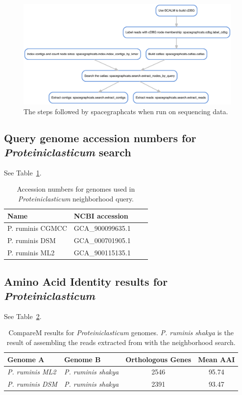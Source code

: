 \begin{figure}
 \centering
 \includegraphics[width=\linewidth]{figures/sgc_dag}
	\caption{The steps followed by \textsf{spacegraphcats} when run
on sequencing data.
}
 \label{fig:sgc_dag}
\end{figure}

\subsection{Query genome accession numbers for {\em Proteiniclasticum} search}
\label{subsec:query_accessions}

See Table~\ref{tab:query_accessions}.

\begin{table}[b]
  \begin{tabular}{l l c c }
    \toprule
    Name & NCBI accession \\
    \midrule
    \hline
    P. ruminis CGMCC & GCA\_900099635.1 \\
    P. ruminis DSM & GCA\_000701905.1 \\
    P. ruminis ML2 & GCA\_900115135.1 \\
    \hline
    \bottomrule
  \end{tabular}
  \caption{Accession numbers for genomes used in {\em Proteiniclasticum} neighborhood query.}
  \label{tab:query_accessions}
\end{table}

\subsection{Amino Acid Identity results for {\em Proteiniclasticum}}
\label{subsec:aai}

See Table~\ref{tab:aai}.

\begin{table}
  \begin{tabular}{l l c c }
    \toprule
    Genome A & Genome B & Orthologous Genes & Mean AAI \\
    \midrule
    {\em P. ruminis ML2} & {\em P. ruminis shakya} & 2546 & 95.74 \\
    {\em P. ruminis DSM} & {\em P. ruminis shakya}  & 2391 & 93.47 \\
    \hline
    \bottomrule
  \end{tabular}
  \caption{CompareM results for {\em Proteiniclasticum} genomes. {\em P. ruminis shakya} is the result of assembling the reads extracted from \podarv with the neighborhood search.}
  \label{tab:aai}
\end{table}


